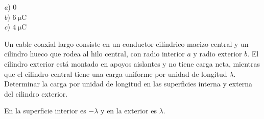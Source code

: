 \begin{Answer}
	\begin{minipage}[t]{.4\textwidth}
		\textit{a}) 0\\ \textit{b}) $\SI{6}{\micro\coulomb}$\\ \textit{c}) $\SI{4}{\micro\coulomb}$
	\end{minipage}
\end{Answer}
%
\begin{Exercise}
	Un cable coaxial largo consiste en un conductor cilíndrico macizo central y un cilindro hueco que rodea al hilo central, con radio interior $a$ y radio exterior $b$. El cilindro exterior está montado en apoyos aislantes y no tiene carga neta, mientras que el cilindro central tiene una carga uniforme por unidad de longitud $\lambda$. Determinar la carga por unidad de longitud en las superficies interna y externa del cilindro exterior.
\end{Exercise}
\begin{Answer}
	\begin{minipage}[t]{.4\textwidth}
		En la superficie interior es $-\lambda$ y en la exterior es $\lambda$.
	\end{minipage}
\end{Answer}
%